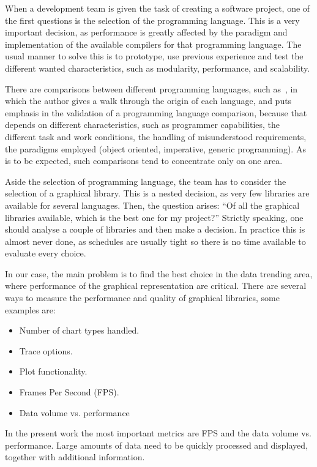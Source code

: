 When a development team is given the task of creating a software project,
one of the first questions is the selection of the programming language.
This is a very important decision, as performance is greatly affected by the
paradigm and implementation of the available compilers for that programming
language. The usual manner to solve this is to prototype, use previous
experience and test the different wanted characteristics, such as
modularity, performance, and scalability.

There are comparisons between different programming
languages, such as~\cite{empirical}, in which the author gives a walk
through the origin of each language, and puts emphasis in the validation
of a programming language comparison, because that depends on different
characteristics, such as programmer capabilities, the different task
and work conditions, the handling of misunderstood requirements,
the paradigms employed (object oriented, imperative, generic programming).
As is to be expected, such comparisons tend to concentrate only on one area.


Aside the selection of programming language, the team has to
consider the selection of a graphical library. This is a nested decision, as very
few libraries are available for several languages.
Then, the question arises: ``Of all the graphical libraries available, which is
the best one for my project?''
Strictly speaking, one should analyse a couple of libraries and
then make a decision. In practice this is almost never done, as schedules are usually tight so
there is no time available to evaluate every choice.

In our case, the main problem is to find the best choice in the data trending
area, where performance of the graphical representation are critical.
There are several ways to measure the performance and quality of graphical
libraries, some examples are:
\begin{itemize}
	\item Number of chart types handled.
	\item Trace options.
	\item Plot functionality.
	\item Frames Per Second (FPS).
        \item Data volume vs. performance
\end{itemize}
In the present work the most important metrics are FPS and the data
volume vs. performance. Large amounts of data need to be quickly processed
and displayed, together with additional information.

